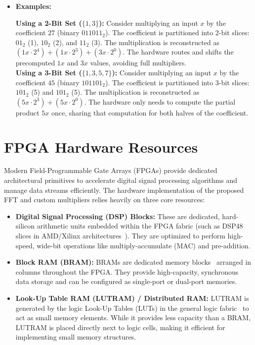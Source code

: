 \begin{itemize}
    \item \textbf{Examples:}
    
        \textbf{Using a 2-Bit Set ($\{1, 3\}$):} Consider multiplying an input $x$ by the coefficient $27$ (binary $011011_2$). The coefficient is partitioned into 2-bit slices: $01_2$ (1), $10_2$ (2), and $11_2$ (3). The multiplication is reconstructed as $(1x \cdot 2^4) + (1x \cdot 2^3) + (3x \cdot 2^0)$. The hardware routes and shifts the precomputed $1x$ and $3x$ values, avoiding full multipliers.\\
        \textbf{Using a 3-Bit Set ($\{1, 3, 5, 7\}$):} Consider multiplying an input $x$ by the coefficient $45$ (binary $101101_2$). The coefficient is partitioned into 3-bit slices: $101_2$ (5) and $101_2$ (5). The multiplication is reconstructed as $(5x \cdot 2^3) + (5x \cdot 2^0)$. The hardware only needs to compute the partial product $5x$ once, sharing that computation for both halves of the coefficient.
\end{itemize}

\section{FPGA Hardware Resources}

Modern Field-Programmable Gate Arrays (FPGAs) provide dedicated architectural primitives to accelerate digital signal processing algorithms and manage data streams efficiently. The hardware implementation of the proposed FFT and custom multipliers relies heavily on three core resources:

\begin{itemize}
    \item \textbf{Digital Signal Processing (DSP) Blocks:} These are dedicated, hard-silicon arithmetic units embedded within the FPGA fabric (such as DSP48 slices in AMD/Xilinx architectures~\cite{ug479}). They are optimized to perform high-speed, wide-bit operations like multiply-accumulate (MAC) and pre-addition.
    
    \item \textbf{Block RAM (BRAM):} BRAMs are dedicated memory blocks~\cite{ug473} arranged in columns throughout the FPGA. They provide high-capacity, synchronous data storage and can be configured as single-port or dual-port memories.
    
    \item \textbf{Look-Up Table RAM (LUTRAM) / Distributed RAM:} LUTRAM is generated by the logic Look-Up Tables (LUTs) in the general logic fabric~\cite{ug473} to act as small memory elements. While it provides less capacity than a BRAM, LUTRAM is placed directly next to logic cells, making it efficient for implementing small memory structures.
\end{itemize}